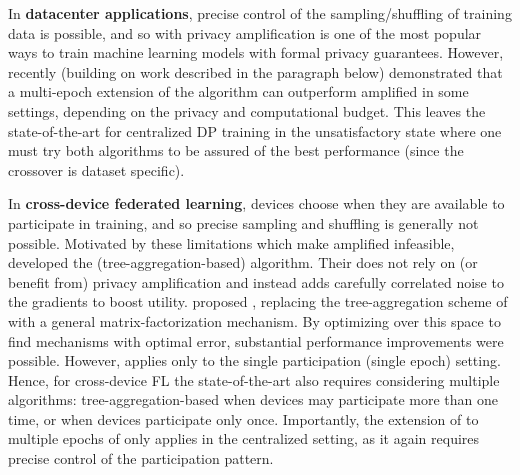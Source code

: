 \documentclass{article}
\begin{document}
In \textbf{datacenter applications}, precise control of the sampling/shuffling of training data is possible, and so \DPSGD with privacy amplification \citep{DP-DL} is one of the most popular ways to train machine learning models with formal privacy guarantees. However, \citet{choquette2022multi} recently (building on work described in the paragraph below) demonstrated that a multi-epoch extension of the \MFFTRL algorithm can outperform amplified \DPSGD in some settings, depending on the privacy and computational budget.
This leaves the state-of-the-art for centralized DP training in the unsatisfactory state where one must try both algorithms to be assured of the best performance (since the crossover is dataset specific). 

In \textbf{cross-device federated learning}, devices choose when they are available to participate in training, and so precise sampling and shuffling is generally not possible.
Motivated by these limitations which make amplified \DPSGD infeasible, \citet{kairouz2021practical} developed the (tree-aggregation-based) \DPFTRL algorithm.   Their \DPFTRL does not rely on (or benefit from) privacy amplification and instead adds carefully correlated noise to the gradients to boost utility.  \citet{denisov22matfact} proposed \MFFTRL, replacing the tree-aggregation scheme of \citet{kairouz2021practical} with a general matrix-factorization mechanism. By optimizing over this space to find mechanisms with optimal error, substantial performance improvements were possible. However, \MFFTRL \citep{denisov22matfact} applies only to the single participation (single epoch) setting. Hence, for cross-device FL the state-of-the-art also requires considering multiple algorithms: tree-aggregation-based \DPFTRL when devices may participate more than one time, or \MFFTRL when devices participate only once. Importantly, the extension of \MFFTRL to multiple epochs of \citet{choquette2022multi} only applies in the centralized setting, as it again requires precise control of the participation pattern.
\end{document}
